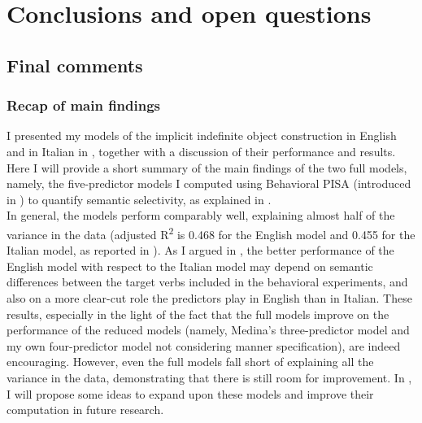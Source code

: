 \setchapterpreamble[u]{\margintoc}
\chapter{Conclusions and open questions}

\section{Final comments} 

\subsection{Recap of main findings}

I presented my models of the implicit indefinite object construction in English and in Italian in , together with a discussion of their performance and results. Here I will provide a short summary of the main findings of the two full models, namely, the five-predictor models I computed using Behavioral PISA (introduced in ) to quantify semantic selectivity, as explained in .\\
In general, the models perform comparably well, explaining almost half of the variance in the data (adjusted R\textsuperscript{2} is 0.468 for the English model and 0.455 for the Italian model, as reported in ). As I argued in , the better performance of the English model with respect to the Italian model may depend on semantic differences between the target verbs included in the behavioral experiments, and also on a more clear-cut role the predictors play in English than in Italian. These results, especially in the light of the fact that the full models improve on the performance of the reduced models (namely, Medina's three-predictor model and my own four-predictor model not considering manner specification), are indeed encouraging. However, even the full models fall short of explaining all the variance in the data, demonstrating that there is still room for improvement. In , I will propose some ideas to expand upon these models and improve their computation in future research.\\
